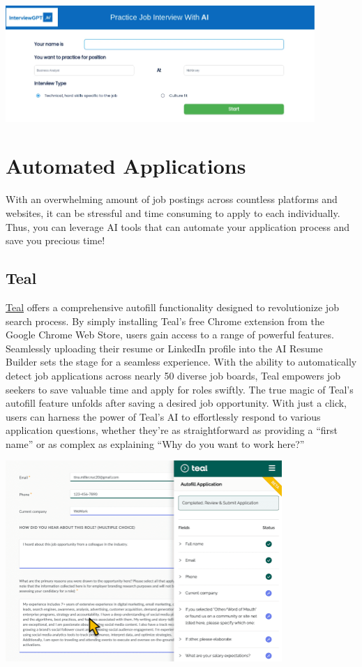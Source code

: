 \documentclass[
]{book}
\begin{document}
\includegraphics[width=4.61458in,height=\textheight]{intergptai pic.png}

\hypertarget{automated-applications}{%
\chapter{Automated Applications}\label{automated-applications}}

With an overwhelming amount of job postings across countless platforms and websites, it can be stressful and time consuming to apply to each individually. Thus, you can leverage AI tools that can automate your application process and save you precious time!

\hypertarget{teal}{%
\section{Teal}\label{teal}}

\href{https://www.tealhq.com/tools/autofill-job-applications}{Teal} offers a comprehensive autofill functionality designed to revolutionize job search process. By simply installing Teal's free Chrome extension from the Google Chrome Web Store, users gain access to a range of powerful features. Seamlessly uploading their resume or LinkedIn profile into the AI Resume Builder sets the stage for a seamless experience. With the ability to automatically detect job applications across nearly 50 diverse job boards, Teal empowers job seekers to save valuable time and apply for roles swiftly. The true magic of Teal's autofill feature unfolds after saving a desired job opportunity. With just a click, users can harness the power of Teal's AI to effortlessly respond to various application questions, whether they're as straightforward as providing a ``first name'' or as complex as explaining ``Why do you want to work here?''

\includegraphics[width=4.125in,height=\textheight]{teal pic.png}
\end{document}
